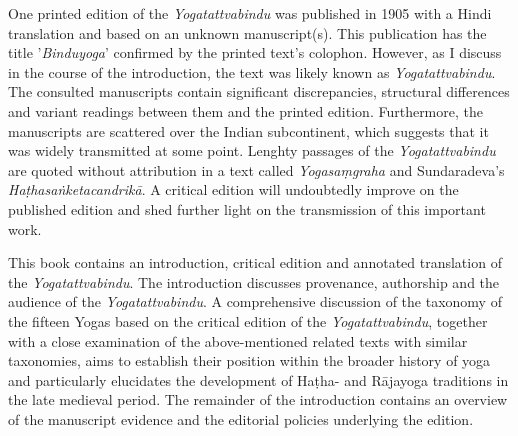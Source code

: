 One printed edition of the \textit{Yogatattvabindu} was published in 1905 with a Hindi translation and based on an unknown manuscript(s). This publication has the title ’\textit{Binduyoga}’ confirmed by the printed text’s colophon. However, as I discuss in the course of the introduction, the text was likely known as \textit{Yogatattvabindu}. The consulted manuscripts contain significant discrepancies, structural differences and variant readings between them and the printed edition. Furthermore, the manuscripts are scattered over the Indian subcontinent, which suggests that it was widely transmitted at some point. Lenghty passages of the \textit{Yogatattvabindu} are quoted without attribution in a text called \textit{Yogasaṃgraha} and Sundaradeva’s \textit{Haṭhasaṅketacandrikā}. A critical edition will undoubtedly improve on the published edition and shed further light on the transmission of this important work.

This book contains an introduction, critical edition and annotated translation of the \textit{Yogatattvabindu}. The introduction discusses provenance, authorship and the audience of the \textit{Yogatattvabindu}. A comprehensive discussion of the taxonomy of the fifteen Yogas based on the critical edition of the \textit{Yogatattvabindu}, together with a close examination of the above-mentioned related texts with similar taxonomies, aims to establish their position within the broader history of yoga and particularly elucidates the development of Haṭha- and Rājayoga traditions in the late medieval period. The remainder of the introduction contains an overview of the manuscript evidence and the editorial policies underlying the edition.

